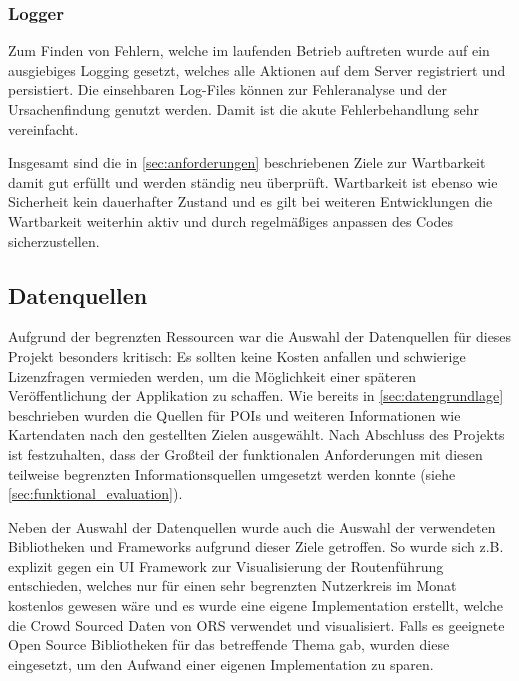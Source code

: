 	\subsubsection{Logger}
	Zum Finden von Fehlern, welche im laufenden Betrieb auftreten wurde auf ein ausgiebiges Logging gesetzt, welches alle Aktionen auf dem Server registriert und persistiert. Die einsehbaren Log-Files können zur Fehleranalyse und der Ursachenfindung genutzt werden. Damit ist die akute Fehlerbehandlung sehr vereinfacht. 
	
	\vspace{0.25cm}
	
	Insgesamt sind die in \autoref{sec:anforderungen} beschriebenen Ziele zur Wartbarkeit damit gut erfüllt und werden ständig neu überprüft. Wartbarkeit ist ebenso wie Sicherheit kein dauerhafter Zustand und es gilt bei weiteren Entwicklungen die Wartbarkeit weiterhin aktiv und durch regelmäßiges anpassen des Codes sicherzustellen.
	
	
	
	\subsection{Datenquellen}
	Aufgrund der begrenzten Ressourcen war die Auswahl der Datenquellen für dieses Projekt besonders kritisch: Es sollten keine Kosten anfallen und schwierige Lizenzfragen vermieden werden, um die Möglichkeit einer späteren Veröffentlichung der Applikation zu schaffen. Wie bereits in \autoref{sec:datengrundlage} beschrieben wurden die Quellen für \acs{POI}s und weiteren Informationen wie Kartendaten nach den gestellten Zielen ausgewählt. Nach Abschluss des Projekts ist festzuhalten, dass der Großteil der funktionalen Anforderungen mit diesen teilweise begrenzten Informationsquellen umgesetzt werden konnte (siehe \autoref{sec:funktional_evaluation}).
	
	\vspace{0.25cm}
	
	Neben der Auswahl der Datenquellen wurde auch die Auswahl der verwendeten Bibliotheken und Frameworks aufgrund dieser Ziele getroffen. So wurde sich z.B. explizit gegen ein UI Framework zur Visualisierung der Routenführung entschieden, welches nur für einen sehr begrenzten Nutzerkreis im Monat kostenlos gewesen wäre und es wurde eine eigene Implementation erstellt, welche die Crowd Sourced Daten von \acs{ORS} verwendet und visualisiert. Falls es geeignete Open Source Bibliotheken für das betreffende Thema gab, wurden diese eingesetzt, um den Aufwand einer eigenen Implementation zu sparen.
	
